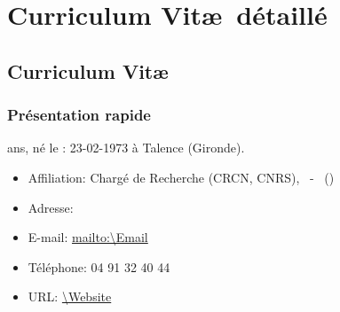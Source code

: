 \chapter{Curriculum Vit\ae\ détaillé}
\section{Curriculum Vit\ae\ }
\subsection{Présentation rapide}%
 ans, né le : 23-02-1973 à  Talence (Gironde).  %

\begin{itemize}
\item Affiliation: Chargé de Recherche (CRCN, CNRS), \Team\ - \Institute\ (\InstituteUMR)
\item Adresse: \Address 
\item E-mail: \url{mailto:\Email} 
\item Téléphone: 04 91 32 40 44
\item URL: \url{\Website}
\end{itemize}



